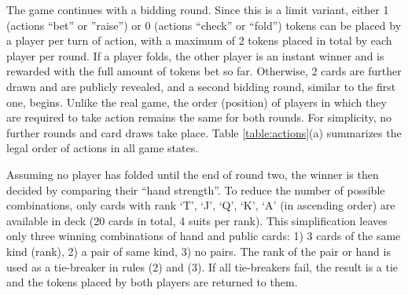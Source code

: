 The game continues with a bidding round. Since this is a limit variant, either 1 (actions ``bet'' or ''raise'') or 0 (actions ``check'' or ``fold'') tokens can be placed by a player per turn of action, with a maximum of 2 tokens placed in total by each player per round. If a player folds, the other player is an instant winner and is rewarded with the full amount of tokens bet so far. Otherwise, 2 cards are further drawn and are publicly revealed, and a second bidding round, similar to the first one, begins. Unlike the real game, the order (position) of players in which they are required to take action remains the same for both rounds. For simplicity, no further rounds and card draws take place. Table \ref{table:actions}(a) summarizes the legal order of actions in all game states.

Assuming no player has folded until the end of round two, the winner is then decided by comparing their ``hand strength''. To reduce the number of possible combinations, only cards with rank `T', `J', `Q', `K', `A' (in ascending order) are available in deck (20 cards in total, 4 suits per rank). This simplification leaves only three winning combinations of hand and public cards: 1) 3 cards of the same kind (rank), 2) a pair of same kind, 3) no pairs. The rank of the pair or hand is used as a tie-breaker in rules (2) and (3). If all tie-breakers fail, the result is a tie and the tokens placed by both players are returned to them.

\begin{table}[htpb]
\centering
{}
\caption{(a) Legal actions of players according to their position and difference between opponent's and player's chips. (b) The actions a Threshold agent selects at any possible state. If both actions shown are legal, the one with higher priority (lower number) will be selected.}
\label{table:actions}
\end{table}

